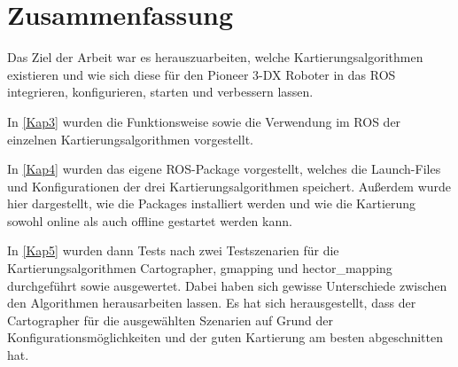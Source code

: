 \chapter{Zusammenfassung} \label{Kap6}

Das Ziel der Arbeit war es herauszuarbeiten, welche Kartierungsalgorithmen existieren und wie sich diese für den Pioneer 3-DX Roboter in das \ac{ROS} integrieren, konfigurieren, starten und verbessern lassen.

In \autoref{Kap3} wurden die Funktionsweise sowie die Verwendung im \ac{ROS} der einzelnen Kartierungsalgorithmen vorgestellt.

In \autoref{Kap4} wurden das eigene \ac{ROS}-Package vorgestellt, welches die Launch-Files und Konfigurationen der drei Kartierungsalgorithmen speichert. Außerdem wurde hier dargestellt, wie die Packages installiert werden und wie die Kartierung sowohl online als auch offline gestartet werden kann.

In \autoref{Kap5} wurden dann Tests nach zwei Testszenarien für die Kartierungsalgorithmen Cartographer, gmapping und hector\_mapping durchgeführt sowie ausgewertet. Dabei haben sich gewisse Unterschiede zwischen den Algorithmen herausarbeiten lassen. Es hat sich herausgestellt, dass der Cartographer für die ausgewählten Szenarien auf Grund der Konfigurationsmöglichkeiten und der guten Kartierung am besten abgeschnitten hat.